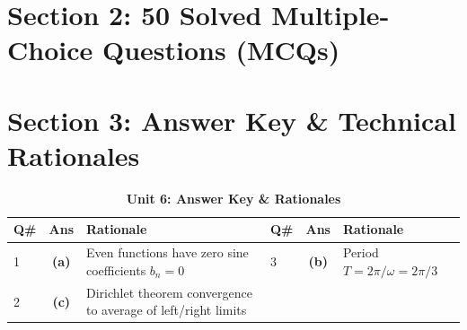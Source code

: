\section{Section 2: 50 Solved Multiple-Choice Questions (MCQs)}

\section{Section 3: Answer Key \& Technical Rationales}
\begin{table}[htbp]
\centering
\caption{\textbf{Unit 6: Answer Key \& Rationales}}
\vspace{2mm}
\begin{tabularx}{\textwidth}{l c X l c X}
\toprule
\textbf{Q\#} & \textbf{Ans} & \textbf{Rationale} & \textbf{Q\#} & \textbf{Ans} & \textbf{Rationale} \\
\midrule
1 & \textbf{(a)} & Even functions have zero sine coefficients $b_n = 0$ & 3 & \textbf{(b)} & Period $T = 2\pi/\omega = 2\pi/3$ \\
2 & \textbf{(c)} & Dirichlet theorem convergence to average of left/right limits & & & \\
\bottomrule
\end{tabularx}
\end{table}
